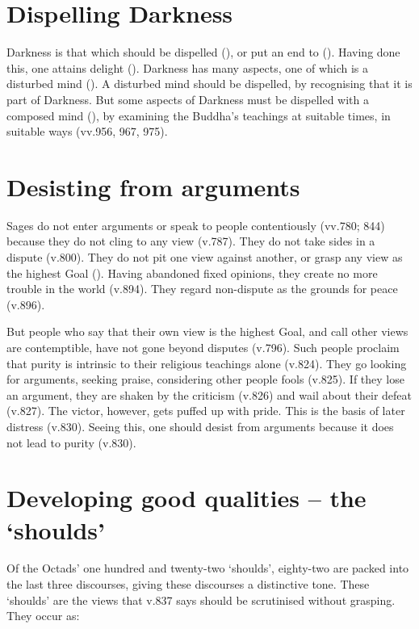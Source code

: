 \section*{Dispelling Darkness}

Darkness is that which should be dispelled (), or put an end to (). Having done this, one attains delight (). Darkness has many aspects, one of which is a disturbed mind (). A disturbed mind should be dispelled, by recognising that it is part of Darkness. But some aspects of Darkness must be dispelled with a composed mind (), by examining the Buddha's teachings at suitable times, in suitable ways (vv.956, 967, 975).

\section*{Desisting from arguments}

Sages do not enter arguments or speak to people contentiously (vv.780; 844) because they do not cling to any view (v.787). They do not take sides in a dispute (v.800). They do not pit one view against another, or grasp any view as the highest Goal (). Having abandoned fixed opinions, they create no more trouble in the world (v.894). They regard non-dispute as the grounds for peace (v.896).

But people who say that their own view is the highest Goal, and call other views are contemptible, have not gone beyond disputes (v.796). Such people proclaim that purity is intrinsic to their religious teachings alone (v.824). They go looking for arguments, seeking praise, considering other people fools (v.825). If they lose an argument, they are shaken by the criticism (v.826) and wail about their defeat (v.827). The victor, however, gets puffed up with pride. This is the basis of later distress (v.830). Seeing this, one should desist from arguments because it does not lead to purity (v.830).

\section*{Developing good qualities -- the `shoulds'}

Of the Octads' one hundred and twenty-two `shoulds', eighty-two are packed into the last three discourses, giving these discourses a distinctive tone. These `shoulds' are the views that v.837 says should be scrutinised without grasping. They occur as:

